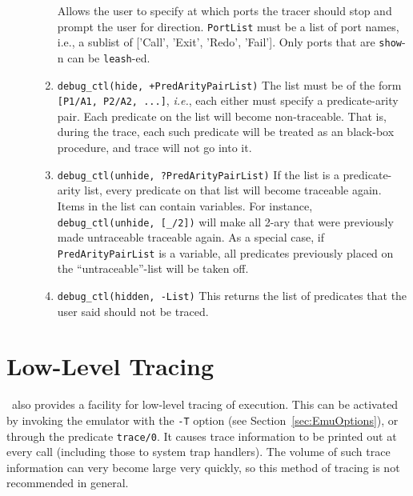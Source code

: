 \begin{description}
\begin{enumerate}
      Allows the user to specify at which ports the tracer should stop
      and prompt the user for direction.  {\tt PortList} must be a list of
      port names, i.e., a sublist of ['Call', 'Exit', 'Redo', 'Fail'].  Only
      ports that are {\tt show}-n can be {\tt leash}-ed. 
    \item {\tt debug\_ctl(hide, +PredArityPairList)}  
      The list must be of the form {\tt [P1/A1, P2/A2, ...]}, {\it i.e.},
      each either must specify a predicate-arity pair. Each predicate on
      the list will become non-traceable. That is, during the trace, each
      such predicate will be treated as an black-box procedure, and trace
      will not go into it.
    \item {\tt debug\_ctl(unhide, ?PredArityPairList)} If the list is a
      predicate-arity list, every predicate on that list will become
      traceable again. Items in the list can contain variables. For
      instance, {\tt debug\_ctl(unhide, [\_/2])} will make all 2-ary that
      were previously made untraceable traceable again.  As a special case,
      if {\tt PredArityPairList} is a variable, all predicates previously
      placed on the ``untraceable''-list will be taken off.
    \item {\tt debug\_ctl(hidden, -List)}
      This returns the list of predicates that the user said should not be
      traced.
   \end{enumerate}
\end{description}


\section{Low-Level Tracing}
 

\ourprolog\ also provides a facility for low-level tracing of execution.
This can be activated by invoking the emulator with the {\tt -T} option
(see Section~\ref{sec:EmuOptions}), or through the predicate {\tt trace/0}.
It causes trace information to be printed out at every call (including
those to system trap handlers).  The volume of such trace information
can very become large very quickly, so this method of tracing is not
recommended in general.

